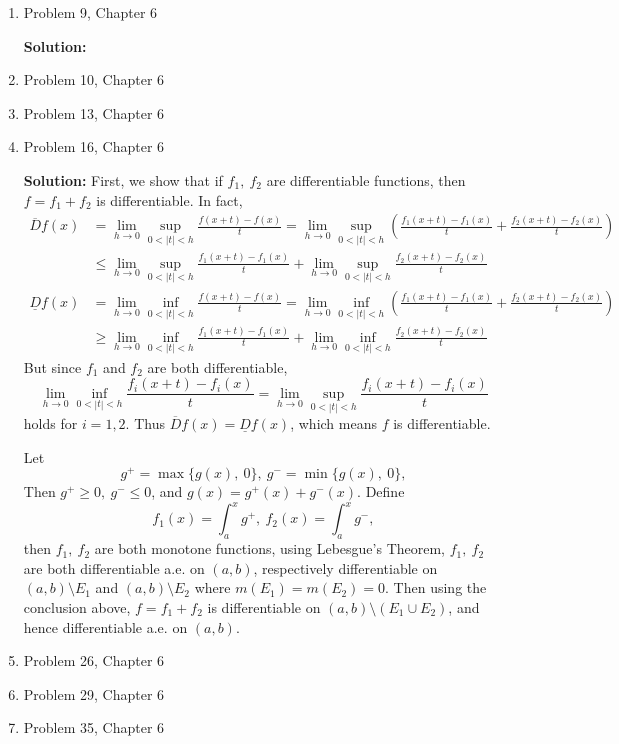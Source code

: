 \documentclass{article}%
\begin{document}
\begin{enumerate}
\item  Problem 9,  Chapter 6 

\smallskip
\textbf{Solution:}
\smallskip



\item  Problem 10, Chapter 6
\item  Problem 13, Chapter 6
\item  Problem 16, Chapter 6

\smallskip
\textbf{Solution:}
\smallskip
First, we show that if $f_1, ~f_2$ are differentiable functions, then $f = f_1+f_2$ is differentiable. In fact,
$$
\begin{aligned}
\overline{D}f(x) &= \lim_{h\to 0}\sup_{0 < |t| < h}\frac{f(x+t)-f(x)}{t} = \lim_{h\to 0}\sup_{0 < |t| < h}(\frac{f_1(x+t)-f_1(x)}{t}+\frac{f_2(x+t)-f_2(x)}{t}) \\
&\le \lim_{h\to 0}\sup_{0 < |t| < h}\frac{f_1(x+t)-f_1(x)}{t} + \lim_{h\to 0}\sup_{0 < |t| < h}\frac{f_2(x+t)-f_2(x)}{t}
\end{aligned}
$$
$$
\begin{aligned}
\underline{D}f(x) &= \lim_{h\to 0}\inf_{0 < |t| < h}\frac{f(x+t)-f(x)}{t} = \lim_{h\to 0}\inf_{0 < |t| < h}(\frac{f_1(x+t)-f_1(x)}{t}+\frac{f_2(x+t)-f_2(x)}{t}) \\
&\ge \lim_{h\to 0}\inf_{0 < |t| < h}\frac{f_1(x+t)-f_1(x)}{t} + \lim_{h\to 0}\inf_{0 < |t| < h}\frac{f_2(x+t)-f_2(x)}{t}
\end{aligned}
$$
But since $f_1$ and $f_2$ are both differentiable, 
$$
\lim_{h\to 0}\inf_{0 < |t| < h}\frac{f_i(x+t)-f_i(x)}{t} = \lim_{h\to 0}\sup_{0 < |t| < h}\frac{f_i(x+t)-f_i(x)}{t}
$$
holds for $i = 1, 2$. Thus $\overline{D}f(x) = \underline{D}f(x)$, which means $f$ is differentiable.

Let
$$
g^+ = \max\{g(x), ~0\}, ~g^- = \min\{g(x), ~0\},
$$
Then $g^+ \ge 0, ~g^- \le 0$, and $g(x) = g^+(x) + g^-(x)$. Define
$$
f_1(x) = \int_{a}^{x}g^+, ~f_2(x) = \int_{a}^{x}g^-,
$$
then $f_1, ~f_2$ are both monotone functions, using Lebesgue's Theorem, $f_1, ~f_2 $ are both differentiable a.e. on $(a, b)$, respectively differentiable on $(a, b)\setminus E_1 $ and $(a, b) \setminus E_2 $ where $m(E_1) = m(E_2) = 0$. Then using the conclusion above, $f = f_1 + f_2 $ is differentiable on $(a, b)\setminus (E_1\cup E_2)$, and hence differentiable a.e. on $(a, b)$.





\item  Problem 26, Chapter 6
\item  Problem 29, Chapter 6
\item  Problem 35, Chapter 6

\end{enumerate}
\end{document}

